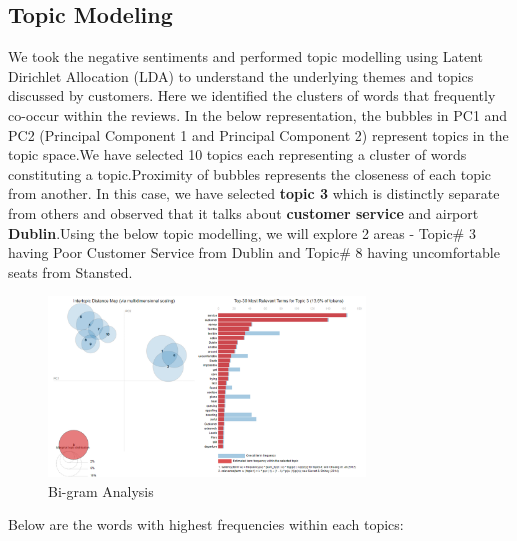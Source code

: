 \documentclass[11pt]{article} %
\begin{document}
\subsection{Topic Modeling}
We took the negative sentiments and performed topic modelling using  Latent Dirichlet Allocation (LDA) to understand the underlying themes and topics discussed by customers. Here we identified the clusters of words that frequently co-occur within the reviews. In the below representation, the bubbles in PC1 and PC2 (Principal Component 1 and Principal Component 2) represent topics in the topic space.We have selected 10 topics each representing a cluster of words constituting a topic.Proximity of bubbles represents the closeness of each topic from another. In this case, we have selected \textbf{topic 3} which is distinctly separate from others and observed that it talks about \textbf{customer service} and airport \textbf{Dublin}.Using the below topic modelling, we will explore 2 areas - Topic\# 3 having Poor Customer Service from Dublin and Topic\# 8 having uncomfortable seats from Stansted.
\begin{figure}[H]
    \centering
    \includegraphics[width=0.75\textwidth]{images/lda_topic_model_3.png}
    \caption{Bi-gram Analysis}
    \label{fig:Bi-gram Analysis}
\end{figure}
Below are the words with highest frequencies within each topics:
\end{document}
